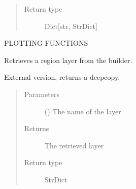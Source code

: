 \documentclass[letterpaper,10pt,english]{sphinxmanual}
\begin{document}
\begin{fulllineitems}
\begin{fulllineitems}
\begin{quote}
\begin{description}
\item[{Return type}] \leavevmode
\sphinxAtStartPar
Dict{[}str, StrDict{]}

\end{description}\end{quote}

\end{fulllineitems}


\begin{fulllineitems}
\label{\detokenize{builder:geohexviz.builder.PlotBuilder.get_query_data}}
\sphinxAtStartPar
PLOTTING FUNCTIONS

\end{fulllineitems}


\begin{fulllineitems}
\label{\detokenize{builder:geohexviz.builder.PlotBuilder.get_region}}
\sphinxAtStartPar
Retrieves a region layer from the builder.

\sphinxAtStartPar
External version, returns a deepcopy.
\begin{quote}\begin{description}
\item[{Parameters}] \leavevmode
\sphinxAtStartPar
{} () \textendash{} The name of the layer

\item[{Returns}] \leavevmode
\sphinxAtStartPar
The retrieved layer

\item[{Return type}] \leavevmode
\sphinxAtStartPar
StrDict

\end{description}\end{quote}

\end{fulllineitems}


\end{fulllineitems}
\end{document}
